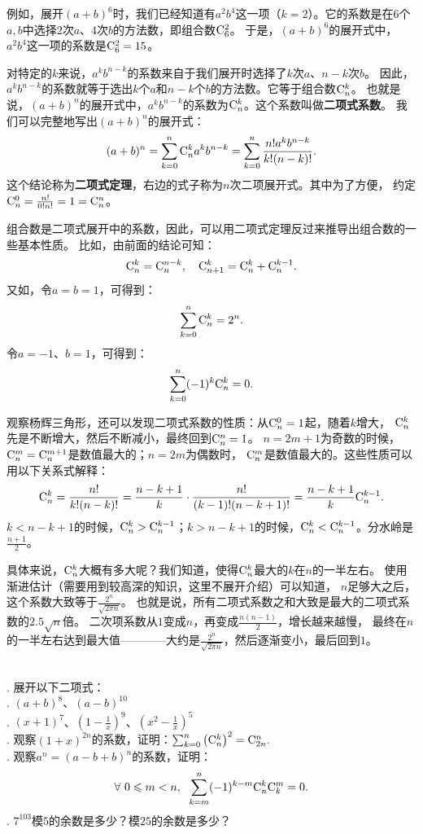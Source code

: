 \documentclass[12pt,UTF8]{ctexbook}
\begin{document}
例如，展开$(a+b)^6$时，我们已经知道有$a^2b^4$这一项（$k=2$）。它的系数是在$6$个$a,b$中选择$2$次$a$、$4$次$b$的方法数，即组合数$\mathrm{C}_{6}^{2}$。
于是，$(a+b)^6$的展开式中，$a^2b^4$这一项的系数是$\mathrm{C}_{6}^{2} = 15$。

对特定的$k$来说，$a^kb^{n-k}$的系数来自于我们展开时选择了$k$次$a$、$n-k$次$b$。
因此，$a^kb^{n-k}$的系数就等于选出$k$个$a$和$n-k$个$b$的方法数。它等于组合数$\mathrm{C}_{n}^{k}$。
也就是说，$(a+b)^n$的展开式中，$a^kb^{n-k}$的系数为$\mathrm{C}_{n}^{k}$。这个系数叫做\textbf{二项式系数}。
我们可以完整地写出$(a+b)^n$的展开式：
$$(a+b)^n = \sum_{k=0}^n \mathrm{C}_{n}^{k} a^kb^{n-k} = \sum_{k=0}^n \frac{n!a^kb^{n-k}}{k!(n-k)!} .$$
这个结论称为\textbf{二项式定理}，右边的式子称为$n$次二项展开式。其中为了方便，
约定$\mathrm{C}_{n}^{0} = \frac{n!}{0!n!} = 1 = \mathrm{C}_{n}^{n}$。

组合数是二项式展开中的系数，因此，可以用二项式定理反过来推导出组合数的一些基本性质。
比如，由前面的结论可知：
$$\mathrm{C}_{n}^{k} = \mathrm{C}_{n}^{n-k}, \quad \mathrm{C}_{n+1}^{k} = \mathrm{C}_{n}^{k} + \mathrm{C}_{n}^{k-1}.$$
又如，令$a=b=1$，可得到：
$$\sum_{k=0}^n \mathrm{C}_{n}^{k} = 2^n.$$
令$a=-1$、$b=1$，可得到：
$$\sum_{k=0}^n (-1)^k \mathrm{C}_{n}^{k} = 0.$$

观察杨辉三角形，还可以发现二项式系数的性质：从$\mathrm{C}_{n}^{0}=1$起，随着$k$增大，
$\mathrm{C}_{n}^{k}$先是不断增大，然后不断减小，最终回到$\mathrm{C}_{n}^{n} = 1$。
$n=2m+1$为奇数的时候，$\mathrm{C}_{n}^{m}=\mathrm{C}_{n}^{m+1}$是数值最大的；$n=2m$为偶数时，
$\mathrm{C}_{n}^{m}$是数值最大的。这些性质可以用以下关系式解释：
$$ \mathrm{C}_{n}^{k} = \frac{n!}{k!(n-k)!} = \frac{n-k+1}{k}\cdot \frac{n!}{(k-1)!(n-k+1)!} = \frac{n-k+1}{k}\mathrm{C}_{n}^{k-1}.$$
$k < n-k+1$的时候，$\mathrm{C}_{n}^{k} > \mathrm{C}_{n}^{k-1}$；$k > n-k+1$的时候，$\mathrm{C}_{n}^{k} < \mathrm{C}_{n}^{k-1}$。分水岭是$\frac{n+1}{2}$。

具体来说，$\mathrm{C}_{n}^{k}$大概有多大呢？我们知道，使得$\mathrm{C}_{n}^{k}$最大的$k$在$n$的一半左右。
使用渐进估计（需要用到较高深的知识，这里不展开介绍）可以知道，
$n$足够大之后，这个系数大致等于$\frac{2^{n}}{\sqrt{2\pi n}}$。
也就是说，所有二项式系数之和大致是最大的二项式系数的$2.5\sqrt{n}$倍。
二次项系数从$1$变成$n$，再变成$\frac{n(n-1)}{2}$，增长越来越慢，
最终在$n$的一半左右达到最大值————大约是$\frac{2^{n}}{\sqrt{2\pi n}}$，然后逐渐变小，最后回到$1$。

\begin{xt}
    \mbox{} \\
    . 展开以下二项式：\\
    . $(a+b)^8$、$(a-b)^{10}$ \\
    . $(x+1)^7$、$(1-\frac{1}{x})^9$、$(x^2-\frac{1}{x})^5$ \\
    . 观察$(1+x)^{2n}$的系数，证明：$\sum_{k=0}^n \left(\mathrm{C}_{n}^{k}\right)^2 = \mathrm{C}_{2n}^{n}.$ \\
    . 观察$a^n = (a-b+b)^n$的系数，证明：
                $$\forall \,\, 0 \leqslant m < n, \;\,\, \sum_{k=m}^n (-1)^{k-m} \mathrm{C}_{n}^{k}\mathrm{C}_{k}^{m} = 0.$$
    . $7^{103}$模$5$的余数是多少？模$25$的余数是多少？

\end{xt}
\end{document}
